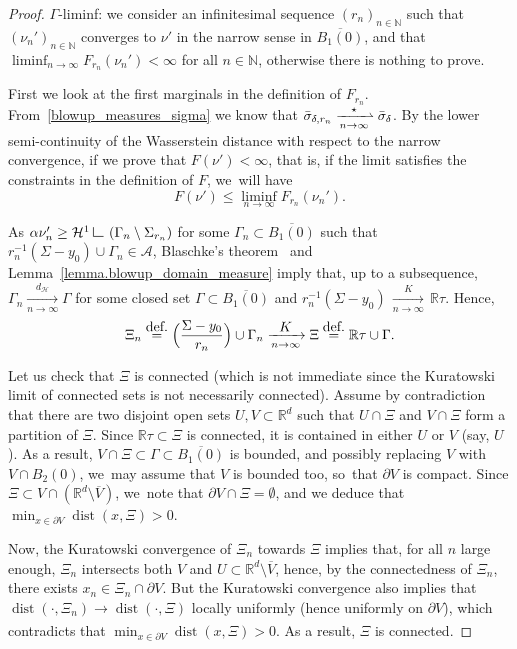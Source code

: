 \documentclass[11pt]{article}
\numberwithin{equation}{section}
\let\ts\textstyle
\theoremstyle{definition}
\newcommand{\eqdef}{\ensuremath{\stackrel{\mbox{\upshape\tiny def.}}{=}}}
\newcommand\LM[1]{\hbox{\vrule width.5pt \vbox to#1pt{\vfill \hrule width#1pt height.5pt}}}
\newcommand\LL{{\mathchoice {\>\LM7\>}{\>\LM7\>}{\,\LM5\,}{\,\LM{3.35}\,}}}
\newcommand{\mres}{\LL}
\newcommand\cH{\mathcal{H}}
\newcommand{\RR}{\mathbb{R}}
\DeclareMathOperator{\dist}{dist}
\newcommand{\distH}{d_{\mathcal{H}}}
\begin{document}
\begin{proof}

$\Gamma$-liminf: we consider an infinitesimal sequence $(r_n)_{n \in \mathbb{N}}$ such that ${(\nu_{n}')}_{n \in \mathbb{N}}$ converges to $\nu'$ in the narrow
sense in $\overline{B_1(0)}$, and that $\liminf_{n \to \infty} F_{r_n}(\nu_n') < \infty$ for all $n \in \mathbb{N}$, otherwise there is nothing to prove.

First we look at the first marginals in the definition of $F_{r_n}$. From~\eqref{blowup_measures_sigma} we know that $\bar \sigma_{\delta, r_n}\xrightharpoonup[n \to \infty]{\star} \bar\sigma_{\delta}$.
By the lower semi-continuity of the Wasserstein distance with respect to the narrow convergence,
if we prove that $F(\nu') < \infty$, that is, if the limit satisfies the constraints in the definition of $F$, we~will have
\[
F(\nu') \le \liminf_{n \to \infty} F_{r_n}(\nu_n').
\]

As $\alpha \nu_n' \ge \cH^1\mres \left(\Gamma_{n}\setminus\Sigma_{r_n}\right)$ for some $\Gamma_n \subset \overline{B_1(0)}$ such that $r_n^{-1}(\Sigma-y_0)\cup \Gamma_n \in \mathcal{A}$, Blaschke's theorem~\cite[Th.\,6.1]{ambrosio2000functions}
and Lemma~\ref{lemma.blowup_domain_measure} imply that, up to a subsequence, $\Gamma_n \xrightarrow[n \to \infty]{\distH} \Gamma$ for some closed set $\Gamma \subset \overline{ B_1(0)}$ and $r_n^{-1}(\Sigma-y_0)\,{\xrightarrow[n \to \infty]{K}}\, \RR\tau$. Hence,
\[
\Xi_n
\eqdef
\Bigl(
\frac{\Sigma - y_0}{r_n}
\Bigr)
\cup \Gamma_n
\xrightarrow[n \to \infty]{\ts K}
\Xi
\eqdef
\RR\tau \cup \Gamma.
\]

Let us check that $\Xi$ is connected (which is not immediate since the Kuratowski limit of connected sets is not necessarily connected).
Assume by contradiction that there are two disjoint open sets $U,V \subset \RR^d$ such that $U\cap \Xi$ and $V\cap \Xi$ form a partition of $\Xi$. Since $\RR\tau \subset \Xi$ is connected, it is contained in either $U$ or $V$ (say, $U$). As a result, $V\cap \Xi\subset \Gamma \subset \overline{B_1(0)}$ is bounded, and possibly replacing $V$ with $V\cap B_2(0)$, we~may assume that $V$ is bounded too, so~that $\partial V$ is compact.
Since $\Xi\subset V\cap (\RR^d\setminus \overline{V})$, we~note that $\partial V \cap \Xi=\emptyset$, and we deduce that $\min_{x\in \partial V} \dist(x,\Xi)>0$.

Now, the Kuratowski convergence of $\Xi_n$ towards $\Xi$ implies that, for all $n$ large enough, $\Xi_n$ intersects both $V$ and $U\subset \RR^d\setminus \overline{V}$, hence, by the connectedness of $\Xi_n$, there exists $x_n\in \Xi_n \cap \partial V$.
But the Kuratowski convergence also implies that $\dist(\cdot,\Xi_n) \xrightarrow[]{} \dist(\cdot,\Xi)$ locally uniformly (hence uniformly on $\partial V$), which contradicts that $\min_{x\in \partial V} \dist(x,\Xi)>0$. As a result, $\Xi$ is connected.


\end{proof}
\end{document}
